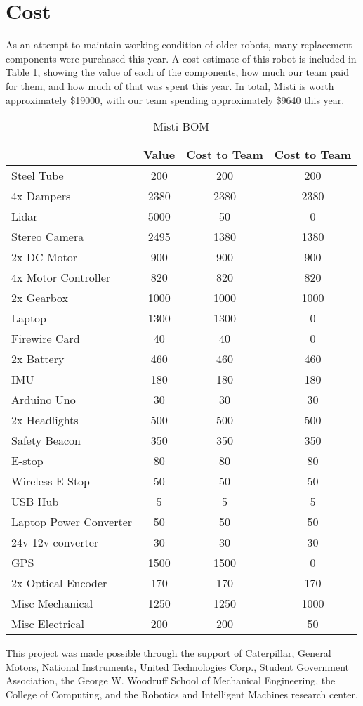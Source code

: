 \section{Cost}

As an attempt to maintain working condition of older robots, many replacement components were purchased this year. A cost estimate of this robot is included in Table \ref{TAB:Cost}, showing the value of each of the components, how much our team paid for them, and how much of that was spent this year. In total, Misti is worth approximately \$19000, with our team spending approximately \$9640 this year.

\begin{table}[H]
\begin{center}
\caption{Misti BOM}
\begin{tabular}{| l | c | c | c |}
\hline
& Value & Cost to Team & Cost to Team\\ \hline
Steel Tube & 200 & 200 & 200\\ \hline
4x Dampers & 2380 & 2380 & 2380\\ \hline
Lidar & 5000 & 50 & 0\\ \hline
Stereo Camera & 2495 & 1380 & 1380\\ \hline
2x DC Motor & 900 & 900 & 900\\ \hline
4x Motor Controller & 820 & 820 & 820\\ \hline
2x Gearbox & 1000 & 1000 & 1000\\ \hline
Laptop & 1300 & 1300 & 0\\ \hline
Firewire Card & 40 & 40 & 0\\ \hline
2x Battery & 460 & 460 & 460\\ \hline
IMU & 180 & 180 & 180\\ \hline
Arduino Uno & 30 & 30 & 30\\ \hline
2x Headlights & 500 & 500 & 500\\ \hline
Safety Beacon & 350 & 350 & 350\\ \hline
E-stop & 80 & 80 & 80\\ \hline
Wireless E-Stop & 50 & 50 & 50\\ \hline
USB Hub & 5 & 5 & 5\\ \hline
Laptop Power Converter & 50 & 50 & 50\\ \hline
24v-12v converter & 30 & 30 & 30\\ \hline
GPS & 1500 & 1500 & 0\\ \hline
2x Optical Encoder & 170 & 170 & 170\\ \hline
Misc Mechanical & 1250 & 1250 & 1000\\ \hline
Misc Electrical & 200 & 200 & 50\\ \hline

\end{tabular}
\label{TAB:Cost}
\end{center}
\end{table}

This project was made possible through the support of Caterpillar, General Motors, National Instruments, United Technologies Corp., Student Government Association, the George W. Woodruff School of Mechanical Engineering, the College of Computing, and the Robotics and Intelligent Machines research center.
